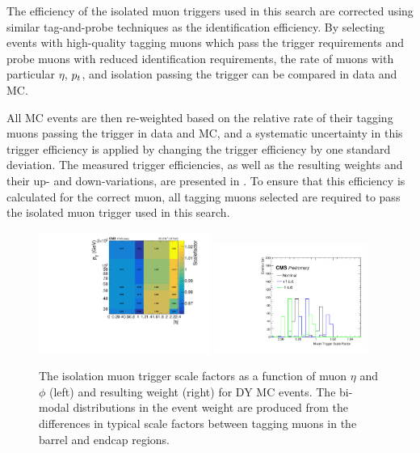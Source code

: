 The efficiency of the isolated muon triggers used in this search are corrected using similar tag-and-probe techniques as the identification efficiency. 
By selecting events with high-quality tagging muons which pass the trigger requirements and probe muons with reduced identification requirements, the rate of muons with particular $\eta$, $p_t$, and isolation passing the trigger can be compared in data and MC.

All MC events are then re-weighted based on the relative rate of their tagging muons passing the trigger in data and MC, and a systematic uncertainty in this trigger efficiency is applied by changing the trigger efficiency by one standard deviation.
The measured trigger efficiencies, as well as the resulting weights and their up- and down-variations, are presented in .
To ensure that this efficiency is calculated for the correct muon, all tagging muons selected are required to pass the isolated muon trigger used in this search.

\begin{figure}[htbp]
	\centering
	\includegraphics[width=0.5\textwidth]{figures/muTrigEff_2018.pdf}
        \hspace{0.01\textwidth}
        \includegraphics[width=0.45\textwidth]{figures/trigSF.pdf}
	\caption[Muon Trigger Scale Factors and Weights]{The isolation muon trigger scale factors as a function of muon $\eta$ and $\phi$ (left) and resulting weight (right) for DY MC events. The bi-modal distributions in the event weight are produced from the differences in typical scale factors between tagging muons in the barrel and endcap regions.}
        \label{fig:muTrigSFs}
\end{figure}


